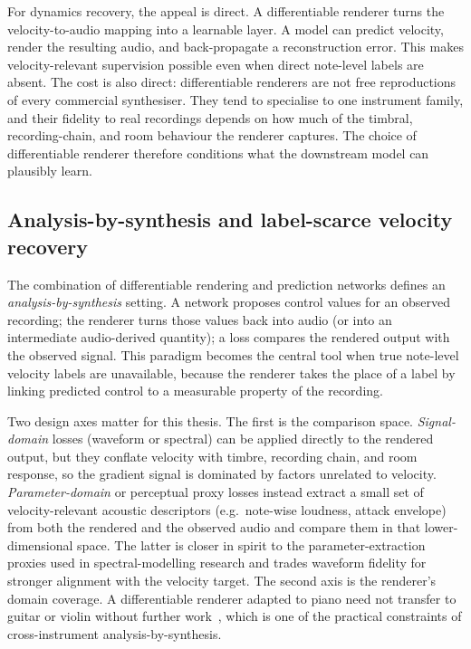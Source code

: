 For dynamics recovery, the appeal is direct. A differentiable renderer turns the velocity-to-audio mapping into a learnable layer. A model can predict velocity, render the resulting audio, and back-propagate a reconstruction error. This makes velocity-relevant supervision possible even when direct note-level labels are absent. The cost is also direct: differentiable renderers are not free reproductions of every commercial synthesiser. They tend to specialise to one instrument family, and their fidelity to real recordings depends on how much of the timbral, recording-chain, and room behaviour the renderer captures. The choice of differentiable renderer therefore conditions what the downstream model can plausibly learn.

\subsection{Analysis-by-synthesis and label-scarce velocity recovery}
\label{sec:bg:synth:analysis}

The combination of differentiable rendering and prediction networks defines an \emph{analysis-by-synthesis} setting. A network proposes control values for an observed recording; the renderer turns those values back into audio (or into an intermediate audio-derived quantity); a loss compares the rendered output with the observed signal. This paradigm becomes the central tool when true note-level velocity labels are unavailable, because the renderer takes the place of a label by linking predicted control to a measurable property of the recording.

Two design axes matter for this thesis. The first is the comparison space. \emph{Signal-domain} losses (waveform or spectral) can be applied directly to the rendered output, but they conflate velocity with timbre, recording chain, and room response, so the gradient signal is dominated by factors unrelated to velocity. \emph{Parameter-domain} or perceptual proxy losses instead extract a small set of velocity-relevant acoustic descriptors (e.g.\ note-wise loudness, attack envelope) from both the rendered and the observed audio and compare them in that lower-dimensional space. The latter is closer in spirit to the parameter-extraction proxies used in spectral-modelling research and trades waveform fidelity for stronger alignment with the velocity target. The second axis is the renderer's domain coverage. A differentiable renderer adapted to piano need not transfer to guitar or violin without further work~\cite{renault2023ddsp_piano,wiggins2023ddsp_guitar_model}, which is one of the practical constraints of cross-instrument analysis-by-synthesis.

